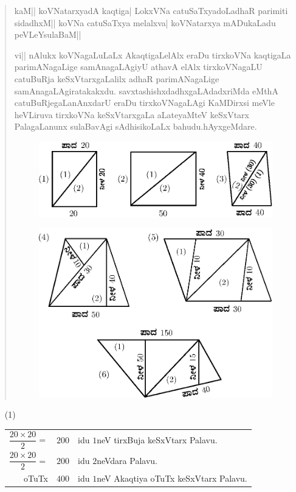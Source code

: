 \begin{verse}
kaM|| koVNatarxyadA kaqtiga| LokxVNa catuSaTxyadoLadhaR parimiti
sidadhxM|| koVNa catuSaTxya melalxva| koVNatarxya mADukaLadu
peVLeYsulaBaM||

vi|| nAlukx koVNagaLuLaLx AkaqtigaLelAlx eraDu tirxkoVNa kaqtigaLa
parimANagaLige samAnagaLAgiyU athavA elAlx tirxkoVNagaLU catuBuRja
keSxVtarxgaLalilx adhaR parimANagaLige
samAnagaLAgiratakakxdu. savxtashishxdadhxgaLAdadxriMda eMthA
catuBuRjegaLanAnxdarU eraDu tirxkoVNagaLAgi KaMDirxsi meVle heVLiruva
tirxkoVNa keSxVtarxgaLa aLateyaMteV keSxVtarx PalagaLanunx sulaBavAgi
sAdhisikoLaLx bahudu.\qquad hAyxgeMdare. 
\begin{figure}[H]
\centering
\includegraphics{figure/fig21.eps}
\end{figure}
\begin{figure}[H]
\centering
\includegraphics{figure/fig22.eps}
\end{figure}
\end{verse}

\begin{itemize}
\item[\rm(1)] 
\begin{tabular}[t]{rcl}
$\dfrac{20\times 20}{2}=$ & $200$ & idu $1$neV tirxBuja keSxVtarx Palavu.\\[15pt]
$\dfrac{20\times 20}{2}=$ & $200$ & idu $2$neVdara Palavu.\\
\cline{2-2}
oTuTx & $400$ & idu $1$neV Akaqtiya oTuTx keSxVtarx Palavu.
\end{tabular}
\end{itemize}

